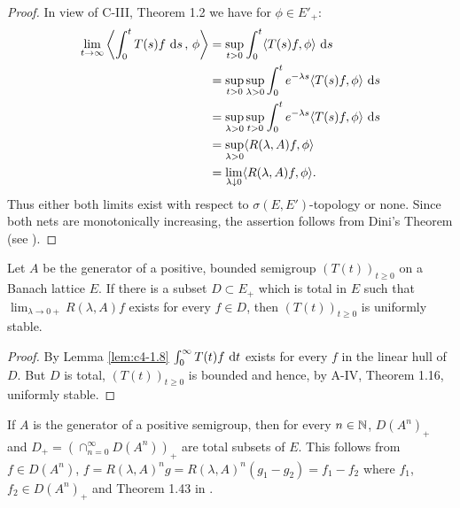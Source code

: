 
\begin{proof}
In view of C-III, Theorem 1.2 we have for $\phi \in E'_{+}$:
\begin{align*}
\lim_{t \to \infty} \left\langle\int_{0}^{t} T(s)f \, \mathop{}\!\mathrm{d}{s} \,,\,\phi\right\rangle &= \sup_{t>0} \int_{0}^{t}\langle T(s)f,\phi\rangle \, \mathop{}\!\mathrm{d}{s} \\
&= \sup_{t>0}\sup_{\lambda>0} \int_{0}^{t}e^{-\lambda s}\langle T(s)f,\phi\rangle \, \mathop{}\!\mathrm{d}{s} \\
&= \sup_{\lambda>0}\sup_{t>0} \int_{0}^{t}e^{-\lambda s}\langle T(s)f,\phi\rangle \, \mathop{}\!\mathrm{d}{s} \\
&= \sup_{\lambda>0} \langle R(\lambda,A)f,\phi\rangle \\
&= \lim_{\lambda \downarrow 0} \langle R(\lambda,A)f,\phi\rangle.
\end{align*}
Thus either both limits exist with respect to $\sigma(E,E')$-topology or none.
Since both nets are monotonically increasing, the assertion follows from Dini's Theorem (see \citet[II. Theorem~5.9]{schaefer:1974}).
\end{proof}

\begin{proposition}\label{prop:c4-1.9}
Let $A$ be the generator of a positive, bounded semigroup $(T(t))_{t \geq 0}$ on a Banach lattice $E$.
If there is a subset $D \subset E_{+}$ which is total in $E$ such that $\lim_{\lambda \to 0+} R(\lambda,A)f$ exists for every $f \in D$, then $(T(t))_{t \geq 0}$ is uniformly stable.
\end{proposition}

\begin{proof}
By Lemma \ref{lem:c4-1.8} $\int_{0}^{\infty} T(t)f \, \mathop{}\!\mathrm{d}{t}$ exists for every $f$ in the linear hull of $D$.
But $D$ is total, $(T(t))_{t \geq 0}$ is bounded and hence, by A-IV, Theorem 1.16, uniformly stable.
\end{proof}

\begin{remark}\label{rem:c4-1.10}
If $A$ is the generator of a positive semigroup, then for every $n \in \mathbb{N}$, $D(A^{n})_{+}$ and $D_{+} = (\cap_{n=0}^{\infty} D(A^{n}))_{+}$ are total subsets of $E$.
This follows from $f \in D(A^{n})$, $f = R(\lambda,A)^{n}g = R(\lambda,A)^{n}(g_{1} - g_{2}) = f_{1} - f_{2}$ where $f_{1}$, $f_{2} \in D(A^{n})_{+}$ and Theorem 1.43 in \citet{davies:1980}.
\end{remark}

